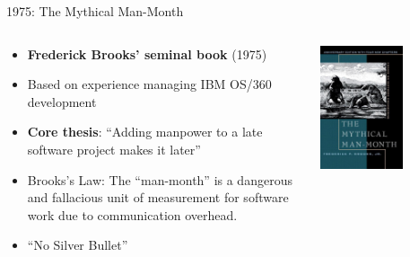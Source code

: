 \documentclass{beamer}
\begin{document}
\begin{frame}[t]{1975: The Mythical Man-Month}
\begin{columns}
    \begin{column}{0.6\textwidth}
        \begin{itemize}
            \item \textbf{Frederick Brooks' seminal book} (1975)
            \item Based on experience managing IBM OS/360 development
            \item \textbf{Core thesis}: ``Adding manpower to a late software project makes it later''
            \item \alert{Brooks's Law}: The ``man-month'' is a dangerous and fallacious unit of measurement for software work due to communication overhead.
            \item ``No Silver Bullet''
        \end{itemize}
    \end{column}
    \begin{column}{0.4\textwidth}
        \includegraphics[width=0.6\textwidth]{images/Mythical Man-Month.jpg}
    \end{column}
\end{columns}
\end{frame}
\end{document}
